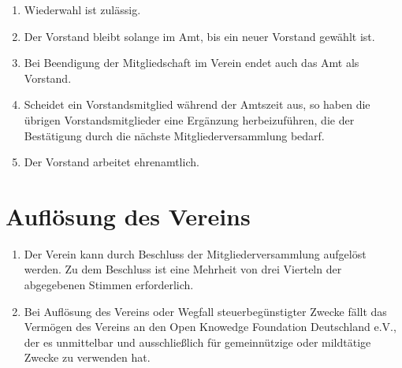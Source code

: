 \documentclass[12pt,a4paper,draft]{article}
\begin{document}
\begin{enumerate}
\item Wiederwahl ist zulässig.

\item Der Vorstand bleibt solange im Amt, bis ein neuer Vorstand gewählt ist.

\item Bei Beendigung der Mitgliedschaft im Verein endet auch das Amt als 
Vorstand.

\item Scheidet ein Vorstandsmitglied während der Amtszeit aus, so haben die 
übrigen Vorstandsmitglieder eine Ergänzung herbeizuführen, die der Bestätigung 
durch die nächste Mitgliederversammlung bedarf.

\item Der Vorstand arbeitet ehrenamtlich. %
\end{enumerate}

\section{Auflösung des Vereins}
\begin{enumerate}
\item Der Verein kann durch Beschluss der Mitgliederversammlung aufgelöst 
werden. Zu dem Beschluss ist eine Mehrheit von drei Vierteln der abgegebenen 
Stimmen erforderlich. %

\item Bei Auflösung des Vereins oder Wegfall steuerbegünstigter Zwecke fällt 
das Vermögen des Vereins an den Open Knowedge Foundation Deutschland e.V., der 
es unmittelbar und ausschließlich für gemeinnützige oder mildtätige Zwecke zu 
verwenden hat. %
\end{enumerate}
\end{document}
